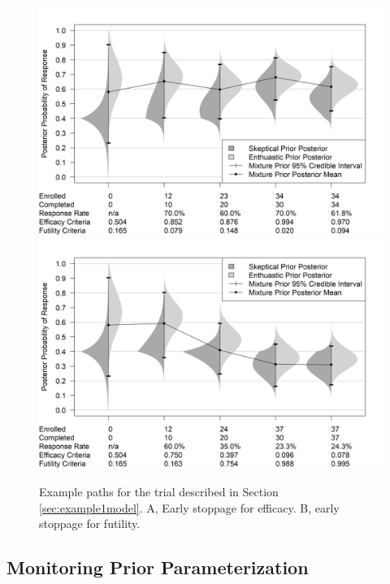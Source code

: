 \documentclass[useAMS,usenatbib,referee]{biom}
\begin{document}
\begin{figure}\begin{center}
    \includegraphics[width=6in]{figure2a.png}
    \includegraphics[width=6in]{figure2b.png}
    \caption{Example paths for the trial described in Section \ref{sec:example1model}. A, Early stoppage for efficacy. B, early stoppage for futility.}
	\label{fig:figure2}
\end{center}
\end{figure}

\subsection{Monitoring Prior Parameterization}
\end{document}
